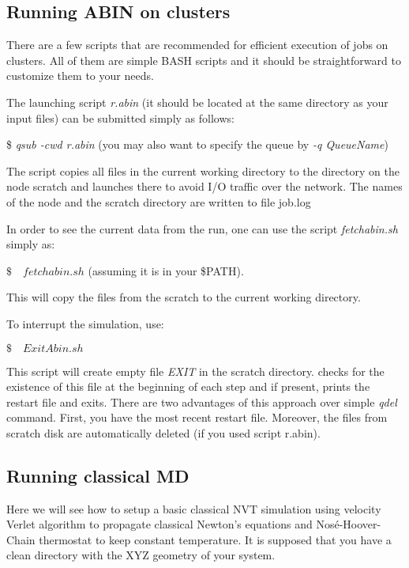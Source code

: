 \subsection{Running ABIN on clusters}
\label{sec:clusters}
There are a few scripts that are recommended for efficient execution of \abin jobs on clusters. All of them are simple BASH scripts and it should be straightforward to customize them to your needs.

The launching script \textit{r.abin} (it should be located at the same directory as your input files) can be submitted simply as follows:

\bigskip 

\colorbox{black!20}{\$  \textit{qsub -cwd r.abin}} (you may also want to specify the queue by \textit{-q QueueName})

\bigskip \noindent 
The script copies all files in the current working directory to the directory on the node scratch and launches \abin there to avoid I/O traffic over the network.
The names of the node and the scratch directory are written to file job.log

In order to see the current data from the run, one can use the script \textit{fetchabin.sh} simply as:

\bigskip
\colorbox{black!20}{$ \$ \quad fetchabin.sh $} (assuming it is in your \textsc{\$PATH}).

\bigskip \noindent 
This will copy the files from the scratch to the current working directory.  

\noindent
To interrupt the simulation, use:

\colorbox{black!20}{$ \$ \quad ExitAbin.sh $}

\bigskip \noindent 
This script will create empty file \textit{EXIT} in the scratch directory. \abin checks for the existence of this file at the beginning of each step and if present, prints the restart file and exits. There are two advantages of this approach over simple \textit{qdel} command. First, you have the most recent restart file. Moreover, the files from scratch disk are automatically deleted (if you used script r.abin).

\subsection{Running classical MD}

Here we will see how to setup a basic classical NVT simulation using velocity Verlet algorithm to propagate classical Newton's equations and Nos\'{e}-Hoover-Chain thermostat to keep constant temperature. 
It is supposed that you have a clean directory with the XYZ geometry of your system.

